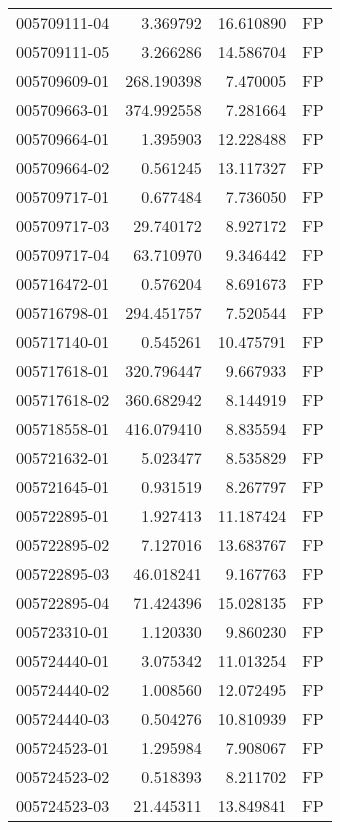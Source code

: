 \begin{tabular}{lrrl}
005709111-04 &    3.369792 &      16.610890 &   FP \\
005709111-05 &    3.266286 &      14.586704 &   FP \\
005709609-01 &  268.190398 &       7.470005 &   FP \\
005709663-01 &  374.992558 &       7.281664 &   FP \\
005709664-01 &    1.395903 &      12.228488 &   FP \\
005709664-02 &    0.561245 &      13.117327 &   FP \\
005709717-01 &    0.677484 &       7.736050 &   FP \\
005709717-03 &   29.740172 &       8.927172 &   FP \\
005709717-04 &   63.710970 &       9.346442 &   FP \\
005716472-01 &    0.576204 &       8.691673 &   FP \\
005716798-01 &  294.451757 &       7.520544 &   FP \\
005717140-01 &    0.545261 &      10.475791 &   FP \\
005717618-01 &  320.796447 &       9.667933 &   FP \\
005717618-02 &  360.682942 &       8.144919 &   FP \\
005718558-01 &  416.079410 &       8.835594 &   FP \\
005721632-01 &    5.023477 &       8.535829 &   FP \\
005721645-01 &    0.931519 &       8.267797 &   FP \\
005722895-01 &    1.927413 &      11.187424 &   FP \\
005722895-02 &    7.127016 &      13.683767 &   FP \\
005722895-03 &   46.018241 &       9.167763 &   FP \\
005722895-04 &   71.424396 &      15.028135 &   FP \\
005723310-01 &    1.120330 &       9.860230 &   FP \\
005724440-01 &    3.075342 &      11.013254 &   FP \\
005724440-02 &    1.008560 &      12.072495 &   FP \\
005724440-03 &    0.504276 &      10.810939 &   FP \\
005724523-01 &    1.295984 &       7.908067 &   FP \\
005724523-02 &    0.518393 &       8.211702 &   FP \\
005724523-03 &   21.445311 &      13.849841 &   FP \\

\end{tabular}
